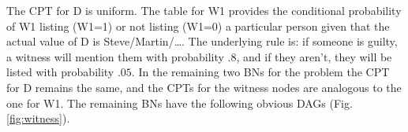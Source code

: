 \documentclass[
  10pt,
]{scrartcl}
\begin{document}
The CPT for \textsf{D} is uniform. The table for \textsf{W1} provides the conditional probability of \textsf{W1} listing (\textsf{W1}=1) or not listing (\textsf{W1}=0) a particular person given that the actual value of \textsf{D} is Steve/Martin/\dots. The underlying rule is: if someone is guilty, a witness will mention them with probability \(.8\), and if they aren't, they will be listed with probability \(.05\). In the remaining two BNs for the problem the CPT for \textsf{D} remains the same, and the CPTs for the witness nodes are analogous to the one for \textsf{W1}. The remaining BNs have the following obvious DAGs (Fig. \ref{fig:witness}).

\begin{figure}[H]
\centering
{}

\end{figure}
\end{document}

